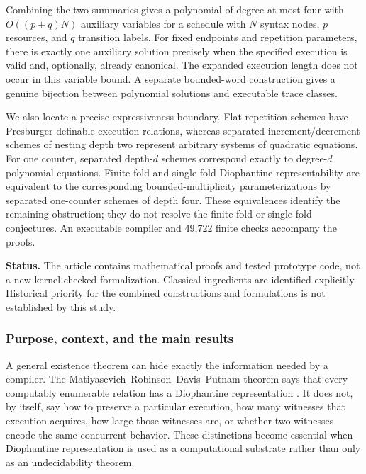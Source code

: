 \documentclass[11pt,a4paper]{article}
\theoremstyle{definition}
\theoremstyle{remark}
\begin{document}
Combining the two summaries gives a polynomial of degree at most four with
$O((p+q)N)$ auxiliary variables for a schedule with $N$ syntax nodes, $p$
resources, and $q$ transition labels. For fixed endpoints and repetition
parameters, there is exactly one auxiliary solution precisely when the
specified execution is valid and, optionally, already canonical. The expanded
execution length does not occur in this variable bound. A separate bounded-word
construction gives a genuine bijection between polynomial solutions and
executable trace classes.

We also locate a precise expressiveness boundary. Flat repetition schemes have
Presburger-definable execution relations, whereas separated increment/decrement
schemes of nesting depth two represent arbitrary systems of quadratic equations.
For one counter, separated depth-$d$ schemes correspond exactly to degree-$d$
polynomial equations. Finite-fold and single-fold Diophantine representability
are equivalent to the corresponding bounded-multiplicity parameterizations by
separated one-counter schemes of depth four. These equivalences identify the
remaining obstruction; they do not resolve the finite-fold or single-fold
conjectures. An executable compiler and 49,722 finite checks accompany the proofs.


\noindent\textbf{Status.} The article contains mathematical proofs and tested
prototype code, not a new kernel-checked formalization. Classical ingredients are
identified explicitly. Historical priority for the combined constructions and
formulations is not established by this study.

\subsubsection{Purpose, context, and the main results}
\label{cdc:cs:sec:intro}

A general existence theorem can hide exactly the information needed by a
compiler. The Matiyasevich--Robinson--Davis--Putnam theorem says that every
computably enumerable relation has a Diophantine representation \cite{mat1970}. It does not,
by itself, say how to preserve a particular execution, how many witnesses that
execution acquires, how large those witnesses are, or whether two witnesses
encode the same concurrent behavior. These distinctions become essential when
Diophantine representation is used as a computational substrate rather than
only as an undecidability theorem.
\end{document}
